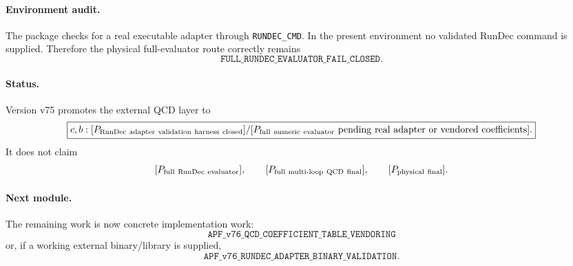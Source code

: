 \paragraph{Environment audit.}
The package checks for a real executable adapter through \texttt{RUNDEC\_CMD}.  In the present environment no validated RunDec command is supplied.  Therefore the physical full-evaluator route correctly remains
\[
 \boxed{\texttt{FULL\_RUNDEC\_EVALUATOR\_FAIL\_CLOSED}.}
\]

\paragraph{Status.}
Version v75 promotes the external QCD layer to
\[
 \boxed{
 c,b:
 [P_{\rm RunDec\ adapter\ validation\ harness\ closed}]
 /
 [P_{\rm full\ numeric\ evaluator}\ {\rm pending\ real\ adapter\ or\ vendored\ coefficients}].
 }
\]
It does not claim
\[
 [P_{\rm full\ RunDec\ evaluator}],\qquad
 [P_{\rm full\ multi\text{-}loop\ QCD\ final}],\qquad
 [P_{\rm physical\ final}].
\]

\paragraph{Next module.}
The remaining work is now concrete implementation work:
\[
 \boxed{\texttt{APF\_v76\_QCD\_COEFFICIENT\_TABLE\_VENDORING}}
\]
or, if a working external binary/library is supplied,
\[
 \boxed{\texttt{APF\_v76\_RUNDEC\_ADAPTER\_BINARY\_VALIDATION}}.
\]
